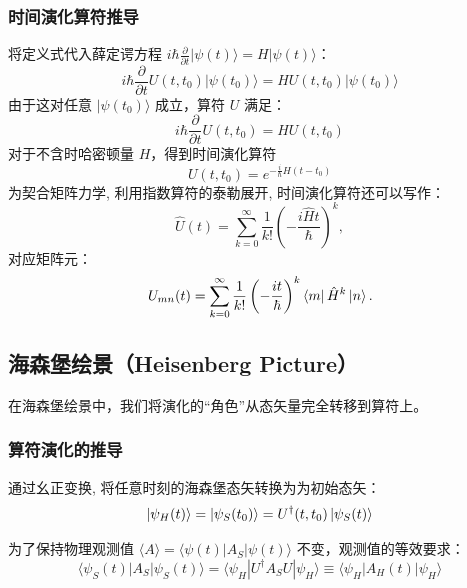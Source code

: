 \subsubsection{时间演化算符推导}
将定义式代入薛定谔方程 $i\hbar \frac{\partial}{\partial t} |\psi(t)\rangle = H |\psi(t)\rangle$：
\begin{equation}
	i\hbar \frac{\partial}{\partial t} U(t, t_0) |\psi(t_0)\rangle = H U(t, t_0) |\psi(t_0)\rangle
\end{equation}
由于这对任意 $|\psi(t_0)\rangle$ 成立，算符 $U$ 满足：
\begin{equation}
	i\hbar \frac{\partial}{\partial t} U(t, t_0) = H U(t, t_0)
\end{equation}
对于不含时哈密顿量 $H$，得到时间演化算符
\begin{equation}
	U(t, t_0) = e^{-\frac{i}{\hbar}H(t-t_0)}
\end{equation}
为契合矩阵力学, 利用指数算符的泰勒展开, 时间演化算符还可以写作：
\begin{equation}
	\hat{U}(t) = \sum_{k=0}^{\infty} \frac{1}{k!} \left( -\frac{i\hat{H}t}{\hbar} \right)^k,
\end{equation}
对应矩阵元：
\begin{equation}
	U_{mn}(t) = \sum_{k=0}^{\infty} \frac{1}{k!} \left( -\frac{it}{\hbar} \right)^k \bra{m}\hat{H}^k\ket{n}.
\end{equation}
\subsection{海森堡绘景（Heisenberg Picture）}

在海森堡绘景中，我们将演化的“角色”从态矢量完全转移到算符上。

\subsubsection{算符演化的推导}
通过幺正变换, 将任意时刻的海森堡态矢转换为为初始态矢：
\begin{equation}
	|\psi_H(t)\rangle = |\psi_S(t_0)\rangle = U^\dagger(t, t_0) \ket{\psi_S(t)}
\end{equation}

为了保持物理观测值 $\langle A \rangle = \langle \psi(t) | A_S | \psi(t) \rangle$ 不变，观测值的等效要求：
\begin{equation}
	\langle \psi_S(t) | A_S | \psi_S(t) \rangle = \langle \psi_H | U^\dagger A_S U | \psi_H \rangle \equiv \langle \psi_H | A_H(t) | \psi_H \rangle
\end{equation}

